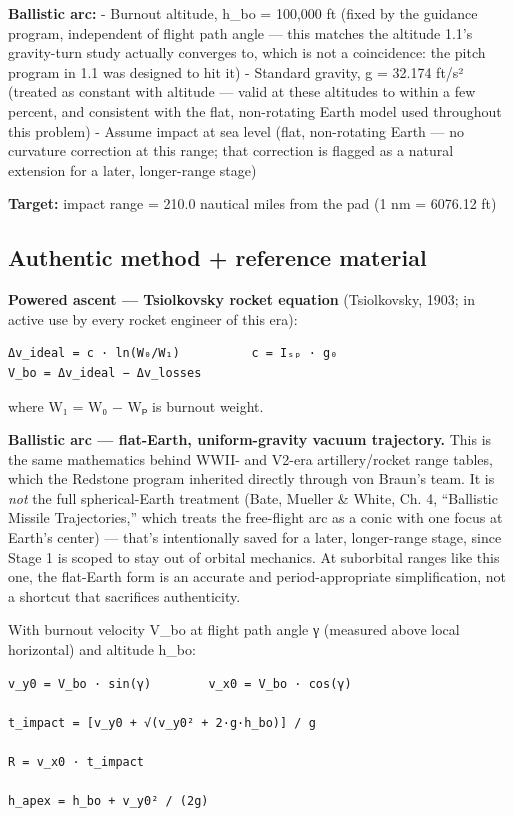 \documentclass[
  10pt,
]{article}
\begin{document}
\textbf{Ballistic arc:} - Burnout altitude, h\_bo = 100,000 ft (fixed by
the guidance program, independent of flight path angle --- this matches
the altitude 1.1's gravity-turn study actually converges to, which is
not a coincidence: the pitch program in 1.1 was designed to hit it) -
Standard gravity, g = 32.174 ft/s² (treated as constant with altitude
--- valid at these altitudes to within a few percent, and consistent
with the flat, non-rotating Earth model used throughout this problem) -
Assume impact at sea level (flat, non-rotating Earth --- no curvature
correction at this range; that correction is flagged as a natural
extension for a later, longer-range stage)

\textbf{Target:} impact range = 210.0 nautical miles from the pad (1 nm
= 6076.12 ft)

\hypertarget{authentic-method-reference-material}{%
\subsection{Authentic method + reference
material}\label{authentic-method-reference-material}}

\textbf{Powered ascent --- Tsiolkovsky rocket equation} (Tsiolkovsky,
1903; in active use by every rocket engineer of this era):

\begin{verbatim}
Δv_ideal = c · ln(W₀/W₁)          c = Iₛₚ · g₀
V_bo = Δv_ideal − Δv_losses
\end{verbatim}

where W₁ = W₀ − Wₚ is burnout weight.

\textbf{Ballistic arc --- flat-Earth, uniform-gravity vacuum
trajectory.} This is the same mathematics behind WWII- and V2-era
artillery/rocket range tables, which the Redstone program inherited
directly through von Braun's team. It is \emph{not} the full
spherical-Earth treatment (Bate, Mueller \& White, Ch. 4, ``Ballistic
Missile Trajectories,'' which treats the free-flight arc as a conic with
one focus at Earth's center) --- that's intentionally saved for a later,
longer-range stage, since Stage 1 is scoped to stay out of orbital
mechanics. At suborbital ranges like this one, the flat-Earth form is an
accurate and period-appropriate simplification, not a shortcut that
sacrifices authenticity.

With burnout velocity V\_bo at flight path angle γ (measured above local
horizontal) and altitude h\_bo:

\begin{verbatim}
v_y0 = V_bo · sin(γ)        v_x0 = V_bo · cos(γ)

t_impact = [v_y0 + √(v_y0² + 2·g·h_bo)] / g

R = v_x0 · t_impact

h_apex = h_bo + v_y0² / (2g)
\end{verbatim}
\end{document}
